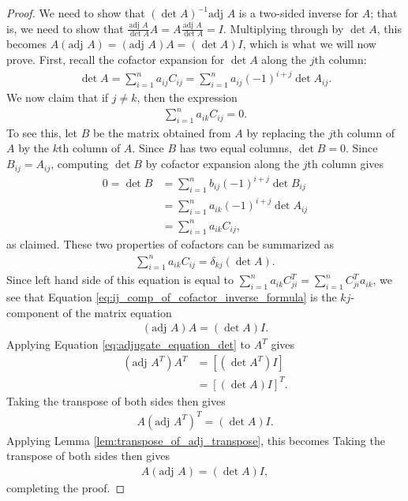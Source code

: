 \documentclass[12pt,letterpaper,reqno]{article}
\numberwithin{equation}{section}
\begin{document}
\begin{proof}
We need to show that $(\det A)^{-1}\text{adj }A$ is a two-sided inverse for $A$; that is, we need to show that $\frac{\text{adj }A}{\det A}A=A\frac{\text{adj }A}{\det A}=I$. Multiplying through by $\det A$, this becomes $A(\text{adj }A)=(\text{adj }A)A=(\det A)I$, which is what we will now prove. First, recall the cofactor expansion for $\det A$ along the $j$th column:
\begin{align*}
	\det A=\sum_{i=1}^n a_{ij}C_{ij}=\sum_{i=1}^n a_{ij}(-1)^{i+j}\det A_{ij}.
\end{align*}
We now claim that if $j \neq k$, then the expression
\begin{align*}
	\sum_{i=1}^n a_{ik}C_{ij}=0.
\end{align*}
To see this, let $B$ be the matrix obtained from $A$ by replacing the $j$th column of $A$ by the $k$th column of $A$. Since $B$ has two equal columns, $\det B=0$. Since $B_{ij}=A_{ij}$, computing $\det B$ by cofactor expansion along the $j$th column gives
\begin{align*}
	0=\det B&=\sum_{i=1}^n b_{ij}(-1)^{i+j}\det B_{ij} \\
	&=\sum_{i=1}^n a_{ik}(-1)^{i+j}\det A_{ij} \\
	&=\sum_{i=1}^na_{ik}C_{ij},
\end{align*}
as claimed. These two properties of cofactors can be summarized as 
\begin{align}\label{eq:ij_comp_of_cofactor_inverse_formula}
	\sum_{i=1}^n a_{ik}C_{ij}=\delta_{kj}(\det A).
\end{align}
Since left hand side of this equation is equal to $\sum_{i=1}^n a_{ik}C_{ji}^T=\sum_{i=1}^n C_{ji}^Ta_{ik}$, we see that Equation \eqref{eq:ij_comp_of_cofactor_inverse_formula} is the $kj$-component of the matrix equation
\begin{align}\label{eq:adjugate_equation_det}
	(\text{adj }A)A=(\det A)I.
\end{align}
Applying Equation \eqref{eq:adjugate_equation_det} to $A^T$ gives
\begin{align*}
	(\text{adj }A^T)A^T&=[(\det A^T)I] \\
	&=[(\det A)I]^T. 
\end{align*}
Taking the transpose of both sides then gives
\begin{align*}
	A(\text{adj }A^T)^T=(\det A)I.
\end{align*}
Applying Lemma \ref{lem:transpose_of_adj_transpose}, this becomes
Taking the transpose of both sides then gives
\begin{align*}
	A(\text{adj }A)=(\det A)I,
\end{align*}
completing the proof.
\end{proof}
\end{document}

